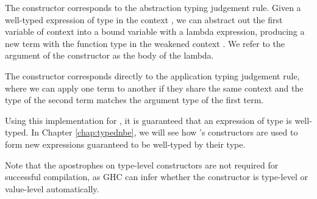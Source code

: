 
The  constructor corresponds to the abstraction typing judgement rule. Given a well-typed expression of type  in the context , we can abstract out the first variable of context into a bound variable with a lambda expression, producing a new term with the function type  in the weakened context . We refer to the argument of the  constructor as the body of the lambda.

The  constructor corresponds directly to the application typing judgement rule, where we can apply one term to another if they share the same context  and the type of the second term matches the argument type  of the first term.

Using this implementation for , it is guaranteed that an expression of type  is well-typed. In Chapter \ref{chap:typednbe}, we will see how 's constructors are used to form new expressions guaranteed to be well-typed by their type.


Note that the apostrophes on type-level constructors are not required for successful compilation, as GHC can infer whether the constructor is type-level or value-level automatically. 


